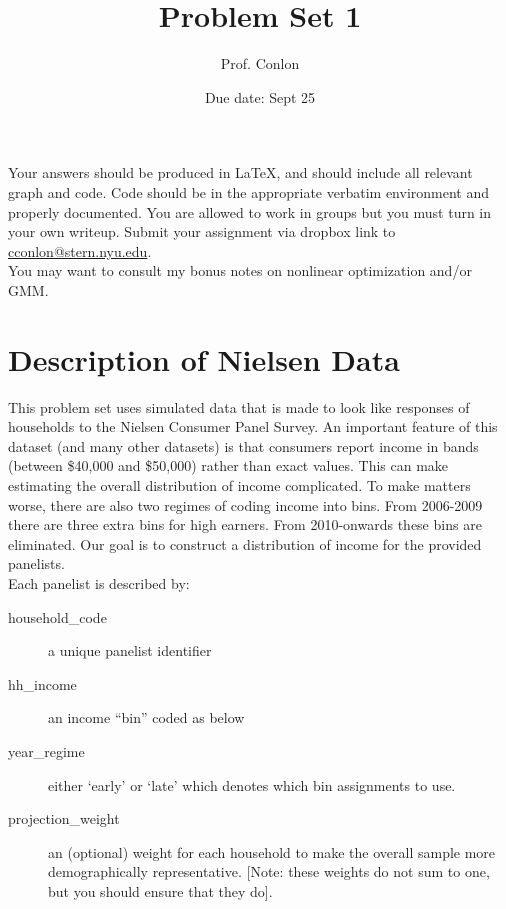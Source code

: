 \documentclass{article}
\title{Problem Set 1}
\begin{document}
\small
\date{Due date: Sept 25}
\author{Prof. Conlon}
\maketitle
Your answers should be produced in \LaTeX, and should include all relevant graph and code.  Code should be in the appropriate verbatim environment and properly documented. You are allowed to work in groups but you must turn in your own writeup. Submit your assignment via dropbox link to \href{mailto:cconlon@stern.nyu.edu}{cconlon@stern.nyu.edu}.\\

You may want to consult my bonus notes on nonlinear optimization and/or GMM.

\section*{\normalsize Description of Nielsen Data}
This problem set uses simulated data that is made to look like responses of households to the Nielsen Consumer Panel Survey. An important feature of this dataset (and many other datasets) is that consumers report income in bands (between \$40,000 and \$50,000) rather than exact values. This can make estimating the overall distribution of income complicated. To make matters worse, there are also two regimes of coding income into bins. From 2006-2009 there are three extra bins for high earners. From 2010-onwards these bins are eliminated. Our goal is to construct a distribution of income for the provided panelists.\\

\noindent Each panelist is described by:
\begin{description}
\item[household\_code] a unique panelist identifier
\item[hh\_income] an income ``bin'' coded as below
\item[year\_regime] either `early' or `late' which denotes which bin assignments to use.
\item[projection\_weight] an (optional) weight for each household to make the overall sample more demographically representative. [Note: these weights do not sum to one, but you should ensure that they do].
\end{description}
\end{document}
